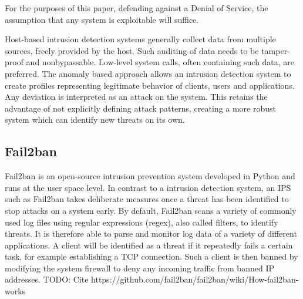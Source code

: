 For the purposes of this paper, defending against a Denial of Service, the assumption that any system is exploitable will suffice.
\noindent

Host-based intrusion detection systems generally collect data from multiple sources, freely provided by the host.
Such auditing of data needs to be tamper-proof and nonbypassable.
Low-level system calls, often containing such data, are preferred.
The anomaly based approach allows an intrusion detection system to create profiles representing legitimate behavior of clients, users and applications.
Any deviation is interpreted as an attack on the system.
This retains the advantage of not explicitly defining attack patterns, creating a more robust system which can identify new threats on its own.\cite{HIDPS}

\subsection{Fail2ban}
Fail2ban is an open-source intrusion prevention system developed in Python and runs at the user space level.
In contrast to a intrusion detection system, an IPS such as Fail2ban takes deliberate measures once a threat has been identified to stop attacks on a system early.
By default, Fail2ban scans a variety of commonly used log files using regular expressions (regex), also called filters, to identify threats.
It is therefore able to parse and monitor log data of a variety of different applications.
A client will be identified as a threat if it repeatedly fails a certain task, for example establishing a TCP connection.
Such a client is then banned by modifying the system firewall to deny any incoming traffic from banned IP addresses. TODO: Cite https://github.com/fail2ban/fail2ban/wiki/How-fail2ban-works

